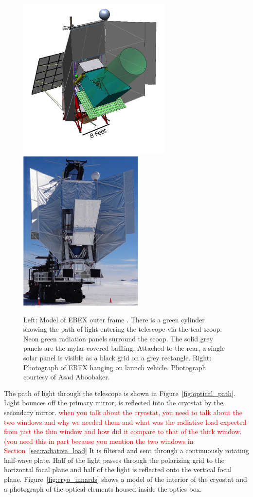 \begin{figure}[htbp]
\begin{center}
\includegraphics[height=3.2in]{figures/ebex_model.png}
\includegraphics[height=3.2in]{figures/ebex_hanging.png}
\caption[Outer frame, model and photograph]{Left: Model of \ac{EBEX} outer frame \cite{Zilic2014}. There is a green cylinder showing the path of light entering the telescope via the teal scoop. Neon green radiation panels surround the scoop. The solid grey panels are the mylar-covered baffling. Attached to the rear, a single solar panel is visible as a black grid on a grey rectangle. Right: Photograph of \ac{EBEX} hanging on launch vehicle. Photograph courtesy of Asad Aboobaker. 
\label{fig:outer_frame} }
\end{center}
\end{figure}

The path of light through the telescope is shown in Figure~\ref{fig:optical_path}. 
Light bounces off the primary mirror, is reflected into the cryostat by the secondary mirror. 
\textcolor{red}{when you talk about the cryostat, you need to talk about the two windows and why we needed them and what was the radiative load expected from just the thin window and how did it compare to that of the thick window. (you need this in part because you mention the two windows in Section~\ref{sec:radiative_load}}
It is filtered and sent through a continuously rotating half-wave plate. 
Half of the light passes through the polarizing grid to the horizontal focal plane and half of the light is reflected onto the vertical focal plane. 
Figure~\ref{fig:cryo_innards} shows a model of the interior of the cryostat and a photograph of the optical elements housed inside the optics box. 

